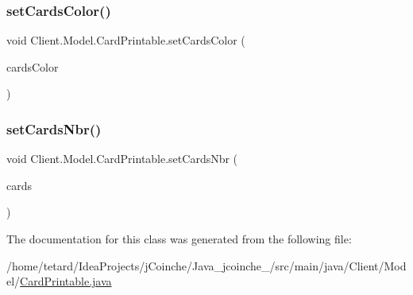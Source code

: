 \mbox{\label{classClient_1_1Model_1_1CardPrintable_a274cad3b9d126733b8836925bf78fdcc}} 
\subsubsection{\texorpdfstring{set\+Cards\+Color()}{setCardsColor()}}
{\footnotesize\ttfamily void Client.\+Model.\+Card\+Printable.\+set\+Cards\+Color (\begin{DoxyParamCaption}\item[{Hash\+Map$<$ \mbox{\hyperlink{enumCommon_1_1Color}{Color}}, String $>$}]{cards\+Color }\end{DoxyParamCaption})\hspace{0.3cm}{\ttfamily [inline]}}

\mbox{\label{classClient_1_1Model_1_1CardPrintable_a6a0d91fd25888e5db9c9ad82ea924c76}} 
\subsubsection{\texorpdfstring{set\+Cards\+Nbr()}{setCardsNbr()}}
{\footnotesize\ttfamily void Client.\+Model.\+Card\+Printable.\+set\+Cards\+Nbr (\begin{DoxyParamCaption}\item[{Hash\+Map}]{cards }\end{DoxyParamCaption})\hspace{0.3cm}{\ttfamily [inline]}}



The documentation for this class was generated from the following file\+:\begin{DoxyCompactItemize}
\item 
/home/tetard/\+Idea\+Projects/j\+Coinche/\+Java\+\_\+jcoinche\+\_/src/main/java/\+Client/\+Model/\mbox{\hyperlink{CardPrintable_8java}{Card\+Printable.\+java}}\end{DoxyCompactItemize}
